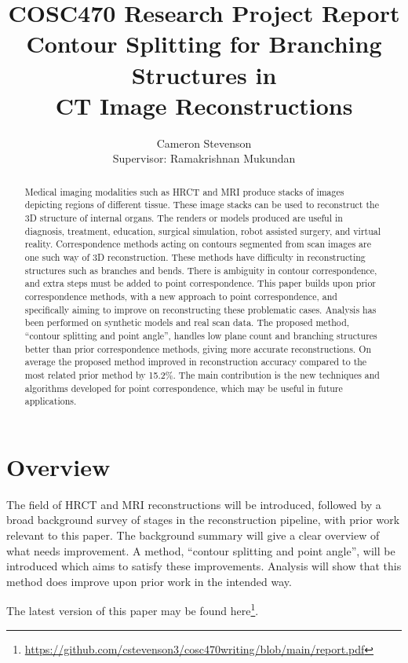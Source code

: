 \documentclass[11p, titlepage]{article}
\title{COSC470 Research Project Report\\
\bigskip
Contour Splitting for Branching Structures in \\CT Image Reconstructions}
\author{Cameron Stevenson\\[0.5cm]{\small Supervisor: Ramakrishnan Mukundan}}
\begin{document}
\maketitle
\begin{abstract}
Medical imaging modalities such as HRCT and MRI produce stacks of images depicting regions of different tissue. These image stacks can be used to reconstruct the 3D structure of internal organs. The renders or models produced are useful in diagnosis, treatment, education, surgical simulation, robot assisted surgery, and virtual reality. Correspondence methods acting on contours segmented from scan images are one such way of 3D reconstruction. These methods have difficulty in reconstructing structures such as branches and bends. There is ambiguity in contour correspondence, and extra steps must be added to point correspondence. This paper builds upon prior correspondence methods, with a new approach to point correspondence, and specifically aiming to improve on reconstructing these problematic cases. Analysis has been performed on synthetic models and real scan data. The proposed method, ``contour splitting and point angle'', handles low plane count and branching structures better than prior correspondence methods, giving more accurate reconstructions. On average the proposed method improved in reconstruction accuracy compared to the most related prior method by 15.2\%. The main contribution is the new techniques and algorithms developed for point correspondence, which may be useful in future applications.
\end{abstract}
\tableofcontents

\section{Overview}

The field of HRCT and MRI reconstructions will be introduced, followed by a broad background survey of stages in the reconstruction pipeline, with prior work relevant to this paper. The background summary will give a clear overview of what needs improvement. A method, ``contour splitting and point angle'', will be introduced which aims to satisfy these improvements. Analysis will show that this method does improve upon prior work in the intended way.

The latest version of this paper may be found here\footnote{\url{https://github.com/cstevenson3/cosc470writing/blob/main/report.pdf}}.

\pagebreak
\end{document}
